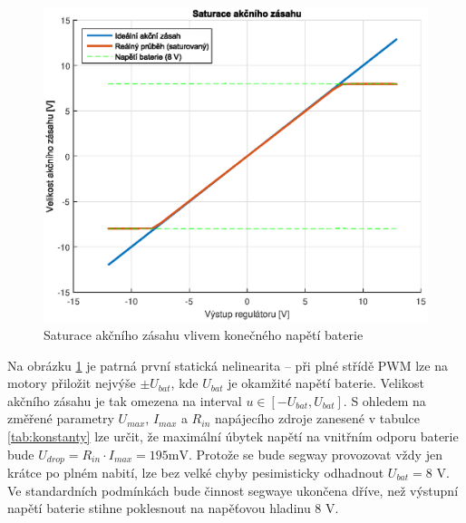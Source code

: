 \documentclass[conference]{IEEEtran}
\begin{document}
\begin{figure}[htbp]
    \centerline{\includegraphics[width=\linewidth]{pwm_saturace.eps}}
    \caption{Saturace akčního zásahu vlivem konečného napětí baterie}
    \label{fig:pwm_saturace}        
\end{figure}

Na obrázku \ref{fig:pwm_saturace} je patrná první statická nelinearita -- při plné střídě PWM lze na motory přiložit nejvýše $\pm U_{bat}$,
kde $U_{bat}$ je okamžité napětí baterie. Velikost akčního zásahu je tak omezena na interval $u \in [-U_{bat}, U_{bat}]$.
S ohledem na změřené parametry $U_{max}$, $I_{max}$ a $R_{in}$ napájecího zdroje zanesené v tabulce \ref{tab:konstanty} lze určit,
že maximální úbytek napětí na vnitřním odporu baterie bude $U_{drop} = R_{in} \cdot I_{max} = 195 \si{\milli\volt}$.
Protože se bude segway provozovat vždy jen krátce po plném nabití, lze bez velké chyby pesimisticky odhadnout $U_{bat} = 8$ \si{V}.
Ve standardních podmínkách bude činnost segwaye ukončena dříve, než výstupní napětí baterie stihne poklesnout na napěťovou hladinu 8 \si{V}.
\end{document}
